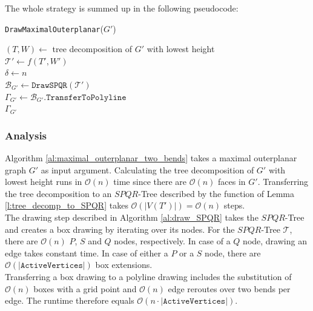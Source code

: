 The whole strategy is summed up in the following pseudocode:\\
\begin{algorithm}[H]
	\caption{\texttt{DrawMaximalOuterplanar}($G'$)}\label{al:maximal_outerplanar_two_bends}
	$(T,W) \gets$ tree decomposition of $G'$ with lowest height\\
	$\mathcal{T'} \gets f(T',W')$\\
	$\delta \gets n$\\
	$\mathcal{B}_{G'} \gets \texttt{DrawSPQR}(\mathcal{T'})$\\
	$\Gamma_{G'} \gets \mathcal{B}_{G'}.\texttt{TransferToPolyline}$\\
	\Return $\Gamma_{G'}$
\end{algorithm}

\subsubsection{Analysis}

Algorithm \ref{al:maximal_outerplanar_two_bends} takes a maximal outerplanar graph $G'$ as input argument. Calculating the tree decomposition of $G'$ with lowest height runs in $\mathcal{O}(n)$ time since there are $\mathcal{O}(n)$ faces in $G'$. Transferring the tree decomposition to an $SPQR$-Tree described by the function of Lemma \ref{l:tree_decomp_to_SPQR} takes $\mathcal{O}(|V(T')|) = \mathcal{O}(n)$ steps.\\
The drawing step described in Algorithm \ref{al:draw_SPQR} takes the $SPQR$-Tree and creates a box drawing by iterating over its nodes. For the $SPQR$-Tree $\mathcal{T}$, there are $\mathcal{O}(n)$ $P$, $S$ and $Q$ nodes, respectively. In case of a $Q$ node, drawing an edge takes constant time. In case of either a $P$ or a $S$ node, there are $\mathcal{O}(|\texttt{ActiveVertices}|)$ box extensions.\\
Transferring a box drawing to a polyline drawing includes the substitution of $\mathcal{O}(n)$ boxes with a grid point and $\mathcal{O}(n)$ edge reroutes over two bends per edge. The runtime therefore equals $\mathcal{O}(n\cdot |\texttt{ActiveVertices}|)$.


